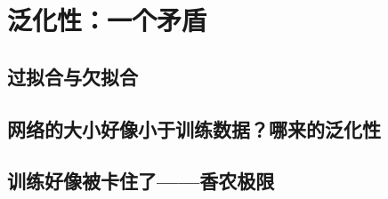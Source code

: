\section{泛化性：一个矛盾}
\subsection{过拟合与欠拟合}
\subsection{网络的大小好像小于训练数据？哪来的泛化性}
\subsection{训练好像被卡住了——香农极限}